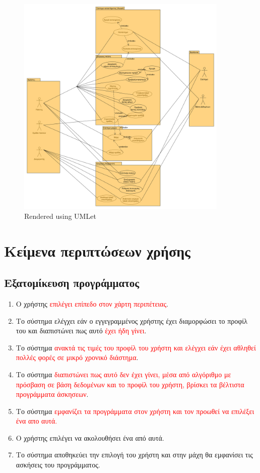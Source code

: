 \begin{figure}[htbp]
  
  \centering
    \includegraphics[width=0.9\textwidth]{graphics/uml.png}
    \caption{Rendered using UMLet}
\end{figure}

\newpage
\section{Κείμενα περιπτώσεων χρήσης}
\subsection{Εξατομίκευση προγράμματος}
\label{sec:profile}
\begin{enumerate}
    \item Ο χρήστης \textcolor{red}{επιλέγει επίπεδο στον χάρτη περιπέτειας}.
    \item Το σύστημα ελέγχει εάν ο εγγεγραμμένος χρήστης έχει διαμορφώσει το προφίλ του και διαπιστώνει πως αυτό \textcolor{red}{έχει ήδη γίνει}.
    \item Το σύστημα \textcolor{red}{ανακτά τις τιμές του προφίλ του χρήστη και ελέγχει εάν έχει αθληθεί πολλές φορές σε μικρό χρονικό διάστημα}.
    \item Το σύστημα \textcolor{red}{διαπιστώνει πως αυτό δεν έχει γίνει, μέσα από αλγόριθμο με πρόσβαση σε βάση δεδομένων και το προφίλ του χρήστη, βρίσκει τα βέλτιστα προγράμματα άσκησεων}.
    \item Το σύστημα \textcolor{red}{εμφανίζει τα προγράμματα στον χρήστη και τον προωθεί να επιλέξει ένα απο αυτά.}
    \item Ο χρήστης επιλέγει να ακολουθήσει ένα από αυτά.
    \item Το σύστημα αποθηκεύει την επιλογή του χρήστη και στην μάχη θα εμφανίσει τις ασκήσεις του προγράμματος.\newline
   
\end{enumerate}

